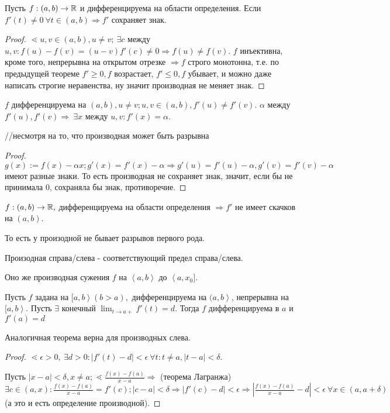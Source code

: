 \documentclass[12pt]{report}
\begin{document}
\begin{thm}
Пусть $f: (a, b) \to \mathbb{R}$ и дифференцируема на области определения. Если $f'(t) \neq 0 ~\forall t \in (a, b) \Rightarrow f'$ сохраняет знак.
\end{thm}
\begin{proof}
$\lessdot u, v \in (a, b), u \neq v; ~\exists c$ между $u, v: f(u) - f(v) = (u - v)f'(c) \neq 0 \Rightarrow f(u) \neq f(v)$. $f$ инъективна, кроме того, непрерывна на открытом отрезке $\Rightarrow f$ строго монотонна, т.е. по предыдущей теореме $f' \ge 0, f$ возрастает, $f' \le 0, f$ убывает, и можно даже написать строгие неравенства, ну значит производная не меняет знак.
\end{proof}

\begin{cor}
$f$ дифференцируема на $(a, b), u \neq v; u,v \in (a, b), f'(u) \neq f'(v)$. $\alpha$ между $f'(u), f'(v) \Rightarrow ~\exists x$ между $u, v: f'(x) = \alpha$.

//несмотря на то, что производная может быть разрывна 
\end{cor}
\begin{proof}
$g(x) := f(x) - \alpha x; g'(x) = f'(x) - \alpha \Rightarrow g'(u) = f'(u) - \alpha, g'(v) = f'(v) - \alpha$ имеют разные знаки. То есть производная не сохраняет знак, значит, если бы не принимала $0$, сохраняла бы знак, противоречие.
\end{proof}

\begin{cor}
$f: (a, b) \to \mathbb{R},$ дифференцируема на области определения $\Rightarrow f'$ не имеет скачков на $(a, b)$.

То есть у произодной не бывает разрывов первого рода.
\end{cor}

\begin{defn}
Произодная справа/слева - соответствующий предел справа/слева.

Оно же производная сужения $f$ на $\left<a, b\right>$ до $\left<a, x_0]\right.$.
\end{defn}

\begin{thm}
Пусть $f$ задана на $\left.[a, b\right> (b > a),$ дифференцируема на $\left.(a, b\right>$, непрерывна на $\left.[a, b\right>$. Пусть $\exists$ конечный $\lim_{t \to a+}{f'(t)} = d$. Тогда $f$ дифференцируема в $a$ и $f'(a) = d$

Аналогичная теорема верна для производных слева.
\end{thm}
\begin{proof}
$\lessdot \epsilon > 0, ~\exists d > 0: |f'(t) - d| < \epsilon ~\forall t: t \neq a, |t - a| < \delta$. 

Пусть $|x - a| < \delta, x \neq a; \lessdot \frac{f(x) - f(a)}{ x - a} \Rightarrow$ (теорема Лагранжа) $\exists c \in (a, x): \frac{f(x) - f(a)}{x - a} = f'(c); |c - a| < \delta \Rightarrow |f'(c) - d| < \epsilon \Rightarrow \left|\frac{f(x) - f(a)}{x - a} - d\right| < \epsilon ~\forall x \in (a, a + \delta)$ (а это и есть определение производной).
\end{proof}
\end{document}
